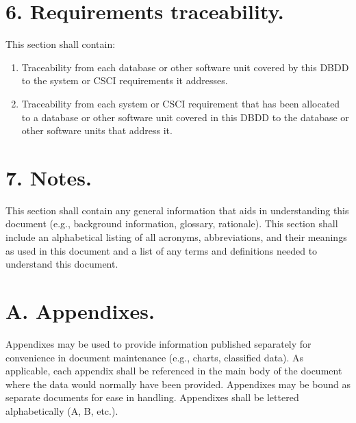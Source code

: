 \section{6. Requirements traceability.}

This section shall contain:

\begin{enumerate}
\itemsep1pt\parskip0pt
\item
  Traceability from each database or other software unit covered by this
  DBDD to the system or CSCI requirements it addresses.
\item
  Traceability from each system or CSCI requirement that has been
  allocated to a database or other software unit covered in this DBDD to
  the database or other software units that address it.
\end{enumerate}

\section{7. Notes.}

This section shall contain any general information that aids in
understanding this document (e.g., background information, glossary,
rationale). This section shall include an alphabetical listing of all
acronyms, abbreviations, and their meanings as used in this document and
a list of any terms and definitions needed to understand this document.

\section{A. Appendixes.}

Appendixes may be used to provide information published separately for
convenience in document maintenance (e.g., charts, classified data). As
applicable, each appendix shall be referenced in the main body of the
document where the data would normally have been provided. Appendixes
may be bound as separate documents for ease in handling. Appendixes
shall be lettered alphabetically (A, B, etc.).
